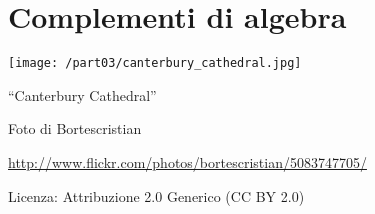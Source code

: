 \part{Complementi di algebra}
\texttt{[image: /part03/canterbury\_cathedral.jpg]}
 \begin{center}
 {\large ``Canterbury Cathedral''}
 \par
 Foto di Bortescristian
 \par
 \url{http://www.flickr.com/photos/bortescristian/5083747705/}\par
 Licenza: Attribuzione 2.0 Generico (CC BY 2.0)\par
 \end{center}
\clearpage
\cleardoublepage
